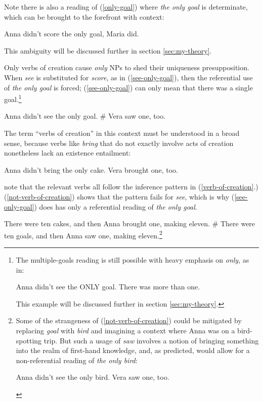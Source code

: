 Note there is also a reading of (\ref{only-goal}) where \textit{the only goal} is determinate, which can be brought to the forefront with context:

\begin{exe}
	\ex Anna didn't score the only goal, Maria did.
\end{exe}

This ambiguity will be discussed further in section \ref{sec:my-theory}.

Only verbs of creation cause \textit{only} NPs to shed their uniqueness presupposition. When \textit{see} is substituted for \textit{score}, as in (\ref{see-only-goal}), then the referential use of \textit{the only goal} is forced; (\ref{see-only-goal}) can only mean that there was a single goal.\footnote{The multiple-goals reading is still possible with heavy emphasis on \textit{only}, as in: \begin{exe} \ex Anna didn't see the ONLY goal. There was more than one. \end{exe} This example will be discussed further in section \ref{sec:my-theory}.}

\begin{exe}
	\ex \label{see-only-goal} Anna didn't see the only goal. \# Vera saw one, too.
\end{exe}

The term ``verbs of creation'' in this context must be understood in a broad sense, because verbs like \textit{bring} that do not exactly involve acts of creation nonetheless lack an existence entailment:

\begin{exe}
	\ex Anna didn't bring the only cake. Vera brought one, too.
\end{exe}

\citet{cb2015} note that the relevant verbs all follow the inference pattern in (\ref{verb-of-creation}.) (\ref{not-verb-of-creation}) shows that the pattern fails for \textit{see}, which is why (\ref{see-only-goal}) does has only a referential reading of \textit{the only goal}.

\begin{exe}
	\ex \label{verb-of-creation} There were ten cakes, and then Anna brought one, making eleven.
	\ex \label{not-verb-of-creation} \# There were ten goals, and then Anna saw one, making eleven.\footnote{Some of the strangeness of (\ref{not-verb-of-creation}) could be mitigated by replacing \textit{goal} with \textit{bird} and imagining a context where Anna was on a bird-spotting trip. But such a usage of \textit{saw} involves a notion of bringing something into the realm of first-hand knowledge, and, as predicted, would allow for a non-referential reading of \textit{the only bird}: \begin{exe} \ex Anna didn't see the only bird. Vera saw one, too. \end{exe} }
\end{exe}

